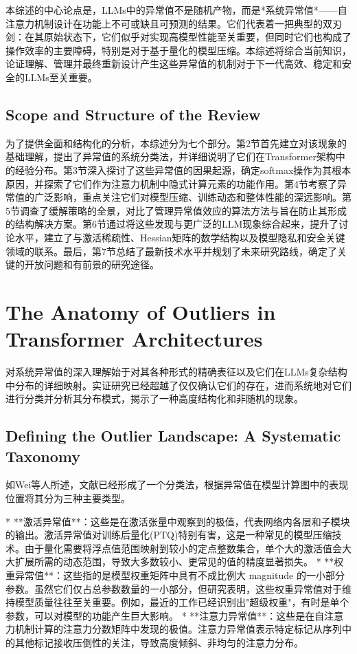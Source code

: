 \documentclass{article}
\begin{document}
本综述的中心论点是，LLMs中的异常值不是随机产物，而是*系统异常值*——自注意力机制设计在功能上不可或缺且可预测的结果。它们代表着一把典型的双刃剑：在其原始状态下，它们似乎对实现高模型性能至关重要，但同时它们也构成了操作效率的主要障碍，特别是对于基于量化的模型压缩。本综述将综合当前知识，论证理解、管理并最终重新设计产生这些异常值的机制对于下一代高效、稳定和安全的LLMs至关重要。

\subsection{Scope and Structure of the Review}

为了提供全面和结构化的分析，本综述分为七个部分。第2节首先建立对该现象的基础理解，提出了异常值的系统分类法，并详细说明了它们在Transformer架构中的经验分布。第3节深入探讨了这些异常值的因果起源，确定softmax操作为其根本原因，并探索了它们作为注意力机制中隐式计算元素的功能作用。第4节考察了异常值的广泛影响，重点关注它们对模型压缩、训练动态和整体性能的深远影响。第5节调查了缓解策略的全景，对比了管理异常值效应的算法方法与旨在防止其形成的结构解决方案。第6节通过将这些发现与更广泛的LLM现象综合起来，提升了讨论水平，建立了与激活稀疏性、Hessian矩阵的数学结构以及模型隐私和安全关键领域的联系。最后，第7节总结了最新技术水平并规划了未来研究路线，确定了关键的开放问题和有前景的研究途径。

\section{The Anatomy of Outliers in Transformer Architectures}

对系统异常值的深入理解始于对其各种形式的精确表征以及它们在LLMs复杂结构中分布的详细映射。实证研究已经超越了仅仅确认它们的存在，进而系统地对它们进行分类并分析其分布模式，揭示了一种高度结构化和非随机的现象。

\subsection{Defining the Outlier Landscape: A Systematic Taxonomy}

如Wei等人\cite{wei2023outlier}所述，文献已经形成了一个分类法，根据异常值在模型计算图中的表现位置将其分为三种主要类型。

* **激活异常值**：这些是在激活张量中观察到的极值，代表网络内各层和子模块的输出。激活异常值对训练后量化(PTQ)特别有害，这是一种常见的模型压缩技术。由于量化需要将浮点值范围映射到较小的定点整数集合，单个大的激活值会大大扩展所需的动态范围，导致大多数较小、更常见的值的精度显著损失。
* **权重异常值**：这些指的是模型权重矩阵中具有不成比例大 magnitude 的一小部分参数。虽然它们仅占总参数数量的一小部分，但研究表明，这些权重异常值对于维持模型质量往往至关重要。例如，最近的工作已经识别出"超级权重"，有时是单个参数，可以对模型的功能产生巨大影响。
* **注意力异常值**：这些是在自注意力机制计算的注意力分数矩阵中发现的极值。注意力异常值表示特定标记从序列中的其他标记接收压倒性的关注，导致高度倾斜、非均匀的注意力分布。
\end{document}
